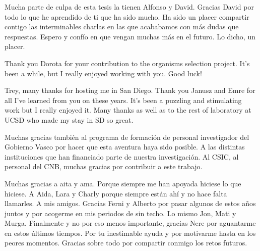{Mucha parte de culpa de esta tesis la tienen Alfonso y David. Gracias David por todo lo que he aprendido de ti que ha sido mucho. Ha sido un placer compartir contigo las interminables charlas en las que acababamos con más dudas que respuestas. Espero y confío en que vengan muchas más en el futuro. Lo dicho, un placer.

Thank you Dorota for your contribution to the organisms selection project. It's been a while, but I really enjoyed working with you. Good luck!  

Trey, many thanks for hosting me in San Diego. Thank you Janusz and Emre for all I’ve learned from you on these years. It’s been a puzzling and stimulating work but I really enjoyed it. Many thanks as well as to the rest of laboratory at UCSD who made my stay in SD so great.

Muchas gracias también al programa de formación de personal investigador del Gobierno Vasco por hacer que esta aventura haya sido posible. A las distintas instituciones que han financiado parte de nuestra investigación. Al CSIC, al personal del CNB, muchas gracias por contribuir a este trabajo.

Muchas gracias a aita y ama. Porque siempre me han apoyada hiciese lo que hiciese. A Aida, Lara y Charly porque siempre están ahí y no hace falta llamarles. A mis amigos. Gracias Ferni y Alberto por pasar algunos de estos años juntos y por acogerme en mis periodos de sin techo. Lo mismo Jon, Mati y Murga. Finalmente y no por eso menos importante, gracias Nere por aguantarme en estos últimos tiempos. Por tu inestimable ayuda y por motivarme hasta en los peores momentos. Gracias sobre todo por compartir conmigo los retos futuros.
 
}
\clearpage  %
